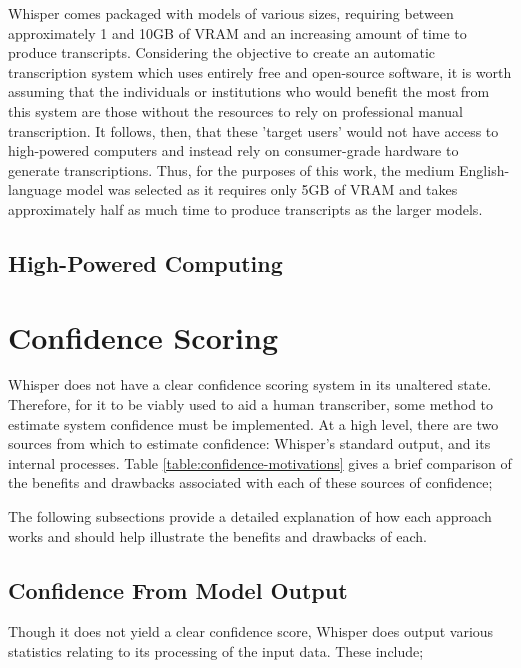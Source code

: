 Whisper comes packaged with models of various sizes, requiring between approximately 1 and 10GB of VRAM and an increasing amount of time to produce transcripts.
Considering the objective to create an automatic transcription system which uses entirely free and open-source software, it is worth assuming that the individuals or institutions who would benefit the most from this system are those without the resources to rely on professional manual transcription.
It follows, then, that these 'target users' would not have access to high-powered computers and instead rely on consumer-grade hardware to generate transcriptions.
Thus, for the purposes of this work, the medium English-language model was selected as it requires only 5GB of VRAM and takes approximately half as much time to produce transcripts as the larger models\cite{whisper}.

\subsection{High-Powered Computing}

\section{Confidence Scoring}

Whisper does not have a clear confidence scoring system in its unaltered state.
Therefore, for it to be viably used to aid a human transcriber, some method to estimate system confidence must be implemented.
At a high level, there are two sources from which to estimate confidence: Whisper's standard output, and its internal processes.
Table \ref{table:confidence-motivations} gives a brief comparison of the benefits and drawbacks associated with each of these sources of confidence;



The following subsections provide a detailed explanation of how each approach works and should help illustrate the benefits and drawbacks of each.

\subsection{Confidence From Model Output}
Though it does not yield a clear confidence score, Whisper does output various statistics relating to its processing of the input data.
These include;

